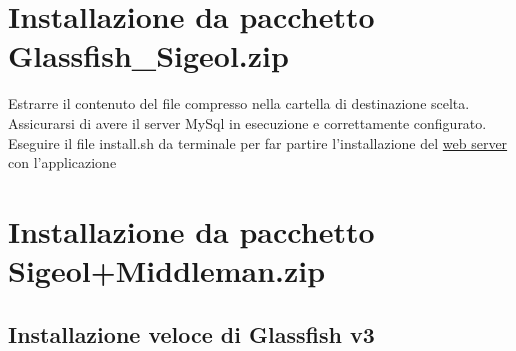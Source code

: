 \documentclass[11pt,a4paper]{article}
\begin{document}
\section{Installazione da pacchetto Glassfish\_Sigeol.zip}
Estrarre il contenuto del file compresso nella cartella di destinazione scelta.\\
Assicurarsi di avere il server MySql in esecuzione e correttamente configurato.\\
Eseguire il file install.sh da terminale per far partire l'installazione del \underline{web server} con l'applicazione

\section{Installazione da pacchetto Sigeol+Middleman.zip}
\subsection{Installazione veloce di Glassfish v3}
\end{document}
